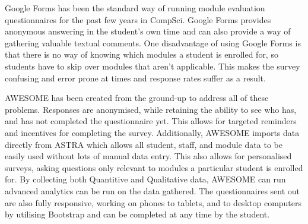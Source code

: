 	Google Forms has been the standard way of running module evaluation questionnaires for the past few years in CompSci.
	Google Forms provides anonymous answering in the student's own time and can also provide a way of gathering valuable textual comments.
	One disadvantage of using Google Forms is that there is no way of knowing which modules a student is enrolled for, so students have to skip over modules that aren't applicable.
	This makes the survey confusing and error prone at times and response rates suffer as a result.
		
	\ac{AWESOME} has been created from the ground-up to address all of these problems.
	Responses are anonymised, while retaining the ability to see who has, and has not completed the questionnaire yet.
	This allows for targeted reminders and incentives for completing the survey.
	Additionally, \ac{AWESOME} imports data directly from \ac{ASTRA} which allows all student, staff, and module data to be easily used without lots of manual data entry.
	This also allows for personalised surveys, asking questions only relevant to modules a particular student is enrolled for.
	By collecting both Quantitive and Qualitative data, \ac{AWESOME} can run advanced analytics can be run on the data gathered.
	The questionnaires sent out are also fully responsive, working on phones to tablets, and to desktop computers by utilising Bootstrap and can be completed at any time by the student.
	
